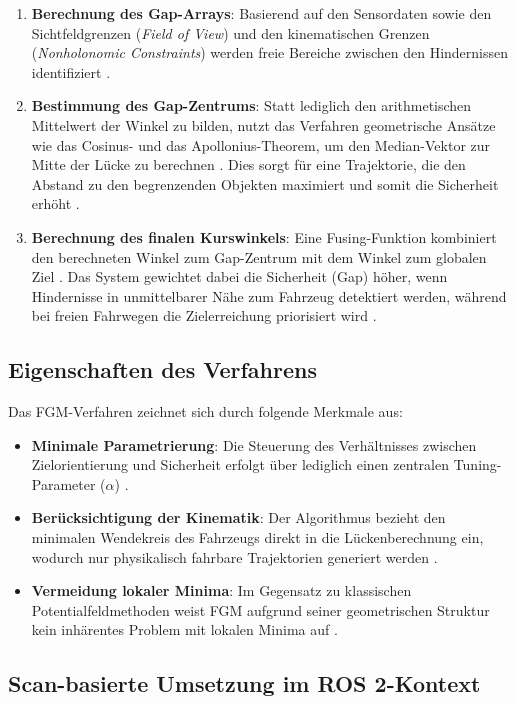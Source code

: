 \begin{enumerate}
    \item \textbf{Berechnung des Gap-Arrays}: Basierend auf den Sensordaten sowie den Sichtfeldgrenzen (\textit{Field of View}) und den kinematischen Grenzen (\textit{Nonholonomic Constraints}) werden freie Bereiche zwischen den Hindernissen identifiziert \cite{sezer2012}.
    \item \textbf{Bestimmung des Gap-Zentrums}: Statt lediglich den arithmetischen Mittelwert der Winkel zu bilden, nutzt das Verfahren geometrische Ansätze wie das Cosinus- und das Apollonius-Theorem, um den Median-Vektor zur Mitte der Lücke zu berechnen \cite{sezer2012}. Dies sorgt für eine Trajektorie, die den Abstand zu den begrenzenden Objekten maximiert und somit die Sicherheit erhöht \cite{sezer2012}.
    \item \textbf{Berechnung des finalen Kurswinkels}: Eine Fusing-Funktion kombiniert den berechneten Winkel zum Gap-Zentrum mit dem Winkel zum globalen Ziel \cite{sezer2012}. Das System gewichtet dabei die Sicherheit (Gap) höher, wenn Hindernisse in unmittelbarer Nähe zum Fahrzeug detektiert werden, während bei freien Fahrwegen die Zielerreichung priorisiert wird \cite{sezer2012}.
\end{enumerate}

\subsection{Eigenschaften des Verfahrens}

Das FGM-Verfahren zeichnet sich durch folgende Merkmale aus:
\begin{itemize}
    \item \textbf{Minimale Parametrierung}: Die Steuerung des Verhältnisses zwischen Zielorientierung und Sicherheit erfolgt über lediglich einen zentralen Tuning-Parameter ($\alpha$) \cite{sezer2012}.
    \item \textbf{Berücksichtigung der Kinematik}: Der Algorithmus bezieht den minimalen Wendekreis des Fahrzeugs direkt in die Lückenberechnung ein, wodurch nur physikalisch fahrbare Trajektorien generiert werden \cite{sezer2012}.
    \item \textbf{Vermeidung lokaler Minima}: Im Gegensatz zu klassischen Potentialfeldmethoden weist FGM aufgrund seiner geometrischen Struktur kein inhärentes Problem mit lokalen Minima auf \cite{sezer2012}.
\end{itemize}

\subsection{Scan-basierte Umsetzung im ROS 2-Kontext}

